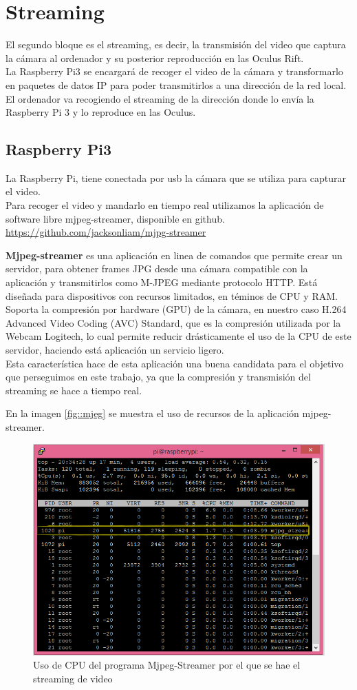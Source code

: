 \documentclass[twoside, 11pt]{epstfg}
\begin{document}
\section{Streaming}
El segundo bloque es el streaming, es decir, la transmisión del video que captura la cámara al ordenador y su posterior reproducción en las Oculus Rift.\\
La Raspberry Pi3 se encargará de recoger el video de la cámara y transformarlo en paquetes de datos IP para poder transmitirlos a una dirección de la red local.\\El ordenador va recogiendo el streaming de la dirección donde lo envía la Raspberry Pi 3 y lo reproduce en las Oculus.

\subsection{Raspberry Pi3}
La Raspberry Pi, tiene conectada por usb la cámara que se utiliza para capturar el video.\\
Para recoger el video y mandarlo en tiempo real utilizamos la aplicación de software libre mjpeg-streamer, disponible en github. \url{https://github.com/jacksonliam/mjpg-streamer}

\textbf{Mjpeg-streamer} es una aplicación en linea de comandos que permite crear un servidor, para obtener frames JPG desde una cámara compatible con la aplicación y transmitirlos como M-JPEG mediante protocolo HTTP. Está diseñada para dispositivos con recursos limitados, en téminos de CPU y RAM.\\
Soporta la compresión por hardware (GPU) de la cámara, en nuestro caso H.264 Advanced Video Coding (AVC) Standard, que es la compresión utilizada por la Webcam Logitech, lo cual permite reducir drásticamente el uso de la CPU de este servidor, haciendo está aplicación un servicio ligero.\\
Esta característica hace de esta aplicación una buena candidata para el objetivo que perseguimos en este trabajo, ya que la compresión y transmisión del streaming se hace a tiempo real.

En la imagen \ref{fig::mjeg} se muestra el uso de recursos de la aplicación mjpeg-streamer.


\begin{figure}[h!]
	\centerline{
		\mbox{\includegraphics[width=.80\textwidth]{images/UsoCPUMjpeg.png}}
	}
	\caption{Uso de CPU del programa Mjpeg-Streamer por el que se hae el streaming de video}
\end{figure}\label{mjpeg}
\end{document}
